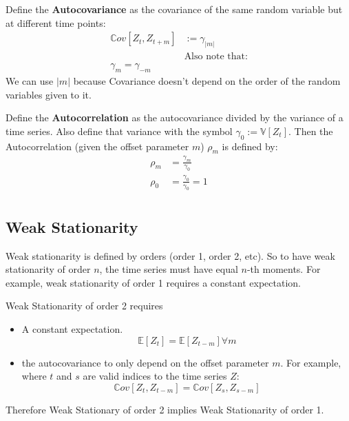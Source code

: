 Define the \textbf{Autocovariance} as the covariance of the same random
variable but at different time points:
\begin{equation*}
    \begin{aligned}
        \mathbb{C}ov[Z_t, Z_{t+m}] &:= \gamma_{|m|} \\
        &\text{Also note that:} \\
        \gamma_m = \gamma_{-m}
    \end{aligned}
\end{equation*}
We can use $|m|$ because Covariance doesn't depend on the order of
the random variables given to it. 

Define the \textbf{Autocorrelation} as the autocovariance divided by the
variance of a time series. Also define that variance with the symbol $\gamma_0
:=  \mathbb{V}[Z_t] $. Then the Autocorrelation (given the offset parameter
$m$) $\rho_m$ is defined by:
\begin{equation*}
    \begin{aligned}
        \rho_m &= \frac{\gamma_m}{\gamma_0} \\
        \rho_0 &= \frac{\gamma_0}{\gamma_0} = 1 \\
    \end{aligned}
\end{equation*}


\subsection{Weak Stationarity}

Weak stationarity is defined by orders (order 1, order 2, etc). So to have weak
stationarity of order $n$, the time series must have equal $n$-th moments.
For example, weak stationarity of order 1 requires a constant expectation.

Weak Stationarity of order 2 requires 
\begin{itemize}
    \item A constant expectation.
    \begin{equation*}
        \mathbb{E}[Z_t] = \mathbb{E}[Z_{t-m}]  \forall m
    \end{equation*}
        
    \item the autocovariance to only depend on the offset parameter $m$. For
        example, where $t$ and $s$ are valid indices to the time series $Z$:
    \begin{equation*}
        \mathbb{C}ov[Z_t, Z_{t-m}] = \mathbb{C}ov[Z_s, Z_{s-m}] 
    \end{equation*}
\end{itemize}
Therefore Weak Stationary of order 2 implies Weak Stationarity of order 1.

